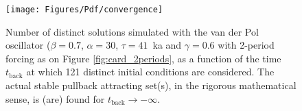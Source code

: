 \begin{figure}
\begin{center}
\texttt{[image: Figures/Pdf/convergence]}
\end{center}
\caption
{
Number of distinct solutions simulated with the van der Pol oscillator ($\beta=0.7$, $\alpha=30$, $\tau=41$~ka and $\gamma=0.6$ with 2-period forcing as on Figure \ref{fig:card_2periods}, as a function of the time $t_{\mathrm{back}}$ at which 121 distinct initial conditions are considered. The actual stable pullback attracting set(s), in the rigorous mathematical sense, is (are) found for $t_\mathrm{back} \rightarrow -\infty$. 
}
\label{fig:convergence}
\end{figure}
